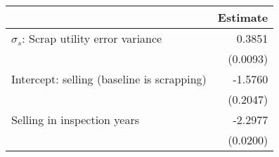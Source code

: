 \begin{tabular}{lr} 
\toprule 
                                &     Estimate  \\ 
\midrule 
$\sigma_s$: Scrap utility error variance  &       0.3851  \\ 
                                & (0.0093)  \\ 
Intercept: selling (baseline is scrapping)  &      -1.5760  \\ 
                                & (0.2047)  \\ 
   Selling in inspection years  &      -2.2977  \\ 
                                & (0.0200)  \\ 
\bottomrule \end{tabular} 
